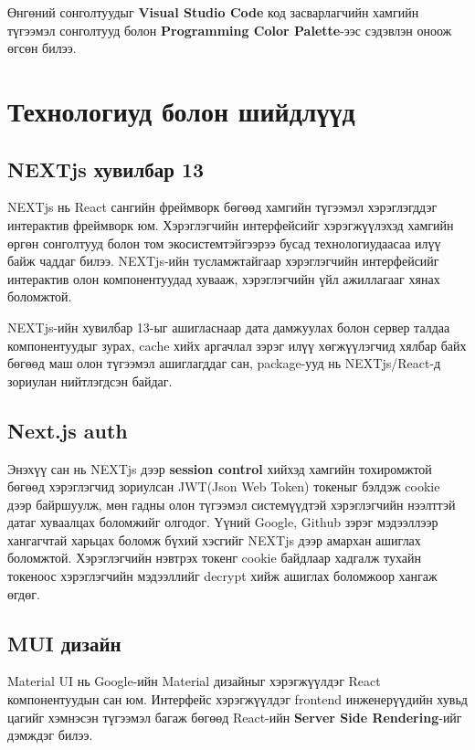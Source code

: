 Өнгөний сонголтуудыг \textbf{Visual Studio Code} код засварлагчийн хамгийн түгээмэл сонголтууд\cite{VSC theme} болон \textbf{Programming Color Palette}-ээс сэдэвлэн оноож өгсөн билээ.

\section{Технологиуд болон шийдлүүд}
\subsection{NEXTjs хувилбар 13}
NEXTjs нь React сангийн фреймворк бөгөөд хамгийн түгээмэл хэрэглэгддэг интерактив фреймворк юм. Хэрэглэгчийн интерфейсийг хэрэгжүүлэхэд хамгийн өргөн сонголтууд болон том экосистем\footnotemark{}тэйгээрээ бусад технологиудаасаа илүү байж чаддаг билээ. NEXTjs-ийн тусламжтайгаар хэрэглэгчийн интерфейсийг интерактив олон компонентуудад хувааж, хэрэглэгчийн үйл ажиллагааг хянах боломжтой. 

NEXTjs-ийн хувилбар 13-ыг ашигласнаар дата дамжуулах болон сервер талдаа компонентуудыг зурах, cache хийх аргачлал зэрэг илүү хөгжүүлэгчид хялбар байх бөгөөд маш олон түгээмэл ашиглагддаг сан, package-ууд нь NEXTjs/React-д зориулан нийтлэгдсэн байдаг.

\subsection{Next.js auth}
Энэхүү сан нь NEXTjs дээр \textbf{session control} хийхэд хамгийн тохиромжтой бөгөөд хэрэглэгчид зориулсан JWT(Json Web Token) токеныг бэлдэж cookie дээр байршуулж, мөн гадны олон түгээмэл системүүдтэй хэрэглэгчийн нээлттэй датаг хуваалцах боломжийг олгодог. Үүний Google, Github зэрэг мэдээллээр хангагчтай харьцах боломж бүхий хэсгийг NEXTjs дээр амархан ашиглах боломжтой. Хэрэглэгчийн нэвтрэх токенг cookie байдлаар хадгалж тухайн токеноос хэрэглэгчийн мэдээллийг decrypt хийж ашиглах боломжоор хангаж өгдөг. 

\subsection{MUI дизайн}
Material UI нь Google-ийн Material дизайныг хэрэгжүүлдэг React компонентуудын сан юм. Интерфейс хэрэгжүүлдэг frontend инженерүүдийн хувьд цагийг хэмнэсэн түгээмэл багаж бөгөөд React-ийн \textbf{Server Side Rendering}-ийг дэмждэг билээ. 

